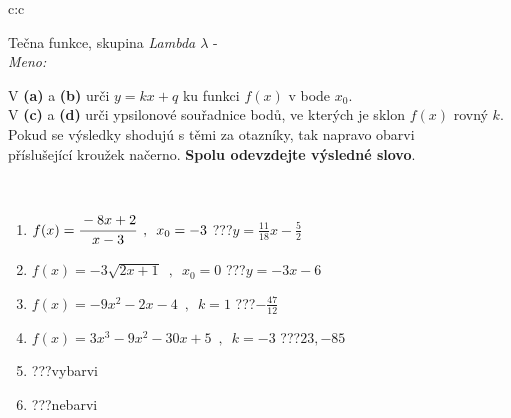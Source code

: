 \documentclass[10pt]{report}
\begin{document}
\newpage
\thispagestyle{empty}
\begin{tabular}{c:c}
\begin{minipage}[c][104.5mm][t]{0.5\linewidth}
\begin{center}
\vspace{7mm}
{\huge Tečna funkce, skupina \textit{Lambda $\lambda$} -}\\[5mm]
\textit{Meno:}\phantom{xxxxxxxxxxxxxxxxxxxxxxxxxxxxxxxxxxxxxxxxxxxxxxxxxxxxxxxxxxxxxxxxx}\\[5mm]
\begin{minipage}{0.95\linewidth}
\begin{center}
V \textbf{(a)} a \textbf{(b)} urči  $y = kx + q$ ku funkci $f(x)$ v bode $x_0$.\\V \textbf{(c)} a \textbf{(d)} urči ypsilonové souřadnice bodů, ve kterých je sklon $f(x)$ rovný $k$.\\Pokud se výsledky shodujú s těmi za otazníky, tak napravo obarvi\\příslušející kroužek načerno. \textbf{Spolu odevzdejte výsledné slovo}.
\end{center}
\end{minipage}
\\[1mm]
\begin{minipage}{0.79\linewidth}
\begin{center}
\begin{varwidth}{\linewidth}
\begin{enumerate}
\small
\item $f(x)=\cfrac{-8x+2}{x-3}\enspace , \enspace x_0=-3$\quad \dotfill\; ???\;\dotfill \quad $y = \frac{11}{18}x-\frac{5}{2}$
\item $f(x)=-3\sqrt{2x+1}\enspace , \enspace x_0=0$\quad \dotfill\; ???\;\dotfill \quad $y = -3x-6$
\item $f(x)=-9x^2-2x-4\enspace , \enspace k=1$\quad \dotfill\; ???\;\dotfill \quad $-\frac{47}{12}$
\item $f(x)=3x^3-9x^2-30x+5\enspace , \enspace k=-3$\quad \dotfill\; ???\;\dotfill \quad $23 , -85$
\item \quad \dotfill\; ???\;\dotfill \quad vybarvi
\item \quad \dotfill\; ???\;\dotfill \quad nebarvi
\end{enumerate}
\end{varwidth}
\end{center}
\end{minipage}
\begin{minipage}{0.20\linewidth}

\end{minipage}
\end{center}
\end{minipage}
\end{tabular}
\end{document}
